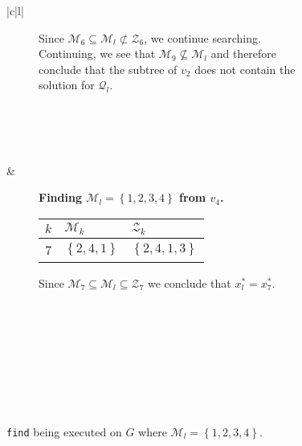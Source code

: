 \begin{figure}[H]
\begin{tabular}[t]{|c|l|}
\begin{subfigure}[b]{0.64\textwidth}
        Since $\mathcal{M}_6 \subseteq \mathcal{M}_l \not \subset
        \mathcal{Z}_6$, we continue searching. Continuing, we see that
        $\mathcal{M}_9 \not \subseteq \mathcal{M}_l$ and therefore conclude
        that the subtree of $v_2$ does not contain the solution for
        $\mathcal{Q}_l$.
        \\
%
        \\
        \\
    \end{subfigure}
    \\ \hline
    \begin{subfigure}[b]{0.35\textwidth}
        \centering
        
    \end{subfigure}
    & 
    \begin{subfigure}[b]{0.64\textwidth}
        \textbf{Finding $\mathcal{M}_l = \left\{{1,2,3,4}\right\}$ from $v_4$.} \\
        \begin{tabular}{rll}
            $k$ & $\mathcal{M}_k$            & $\mathcal{Z}_k$ \\ \hline
            7        & $\left\{{2,4,1}\right\}$   & $\left\{{2,4,1,3}\right\}$ \\ 
        \end{tabular}

        Since $\mathcal{M}_7 \subseteq \mathcal{M}_l \subseteq \mathcal{Z}_7$
        we conclude that $x_l^* = x_7^*$.
        \\
        \\
        \\
        \\
        \\
        \\
        \\
    \end{subfigure}
    \\ \hline
    \end{tabular}
    \caption{\texttt{find} being executed on $G$ where
             $\mathcal{M}_l = \left\{{1,2,3,4}\right\}$.}
    \label{fig:find}
\end{figure}
